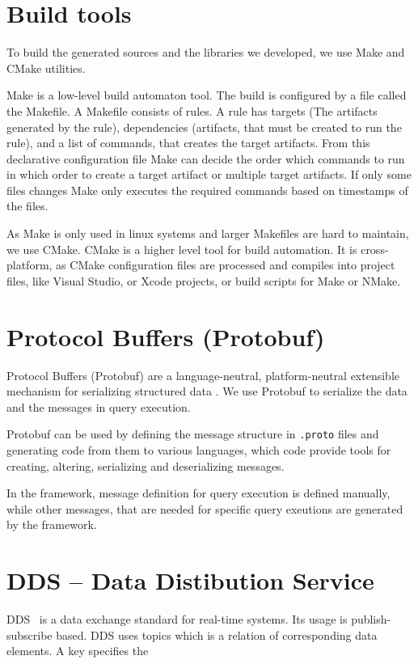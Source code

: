 \section{ Build tools }

To build the generated sources and the \cpp{} libraries we developed, we use Make and CMake utilities. 


Make is a low-level build automaton tool. 
The build is configured by a file called the Makefile.
A Makefile consists of rules. 
A rule has targets (The artifacts generated by the rule), dependencies (artifacts, that must be created to run the rule), and a list of commands, that creates the target artifacts. 
From this declarative configuration file Make can decide the order which commands to run in which order to create a target artifact or multiple target artifacts.
If only some files changes Make only executes the required commands based on timestamps of the files.

As Make is only used in linux systems and larger Makefiles are hard to maintain, we use CMake.
CMake is a higher level tool for build automation. 
It is cross-platform, as CMake configuration files are processed and compiles into project files, like Visual Studio, or Xcode projects, or build scripts for Make or NMake.


\section{Protocol Buffers (Protobuf)}
Protocol Buffers (Protobuf) are a language-neutral, platform-neutral extensible mechanism for serializing structured data \cite{protobuf}. 
We use Protobuf to serialize the data and the messages in query execution.

Protobuf can be used by defining the message structure in \texttt{.proto} files and generating code from them to various languages, which code provide tools for creating, altering, serializing and deserializing messages.

In the framework, message definition for query execution is defined manually, while other messages, that are needed for specific query exeutions are generated by the framework.


\section{DDS -- Data Distibution Service}

DDS~\cite{DDS} is a data exchange standard for real-time systems. 
Its usage is publish-subscribe based.
DDS uses topics which is a relation of corresponding data elements. 
A key specifies the 

